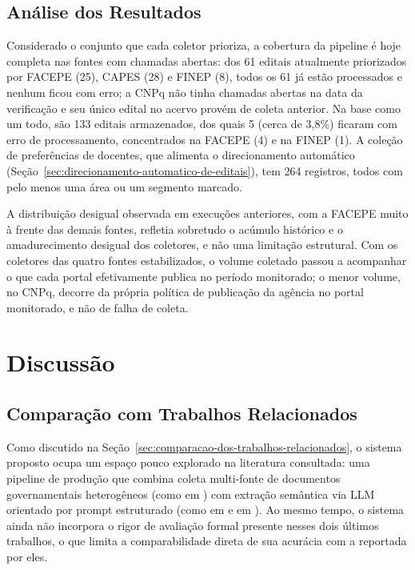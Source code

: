 \documentclass[12pt]{article}
\begin{document}
  \subsection{Análise dos Resultados}\label{sec:analise-dos-resultados}
  Considerado o conjunto que cada coletor prioriza, a cobertura da pipeline é hoje completa nas fontes com chamadas abertas: dos 61 editais atualmente priorizados por FACEPE (25), CAPES (28) e FINEP (8), todos os 61 já estão processados e nenhum ficou com erro; a CNPq não tinha chamadas abertas na data da verificação e seu único edital no acervo provém de coleta anterior. Na base como um todo, são 133 editais armazenados, dos quais 5 (cerca de 3,8\%) ficaram com erro de processamento, concentrados na FACEPE (4) e na FINEP (1). A coleção de preferências de docentes, que alimenta o direcionamento automático (Seção~\ref{sec:direcionamento-automatico-de-editais}), tem 264 registros, todos com pelo menos uma área ou um segmento marcado.

  A distribuição desigual observada em execuções anteriores, com a FACEPE muito à frente das demais fontes, refletia sobretudo o acúmulo histórico e o amadurecimento desigual dos coletores, e não uma limitação estrutural. Com os coletores das quatro fontes estabilizados, o volume coletado passou a acompanhar o que cada portal efetivamente publica no período monitorado; o menor volume, no CNPq, decorre da própria política de publicação da agência no portal monitorado, e não de falha de coleta.

  \section{Discussão}\label{sec:discussao}

  \subsection{Comparação com Trabalhos Relacionados}
  Como discutido na Seção~\ref{sec:comparacao-dos-trabalhos-relacionados}, o sistema proposto ocupa um espaço pouco explorado na literatura consultada: uma pipeline de produção que combina coleta multi-fonte de documentos governamentais heterogêneos (como em \cite{b3}) com extração semântica via LLM orientado por prompt estruturado (como em \cite{b4} e em \cite{b6}). Ao mesmo tempo, o sistema ainda não incorpora o rigor de avaliação formal presente nesses dois últimos trabalhos, o que limita a comparabilidade direta de sua acurácia com a reportada por eles.
\end{document}
